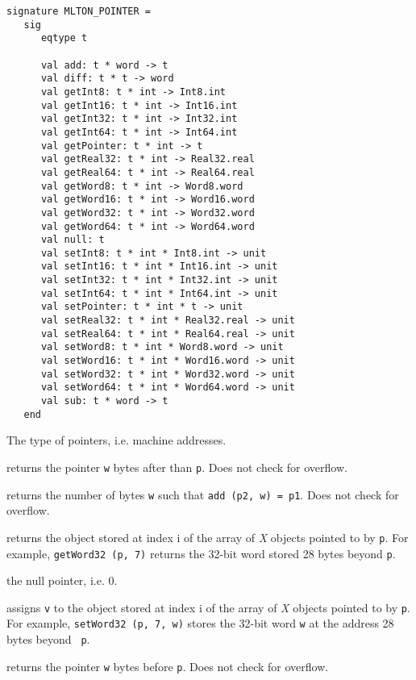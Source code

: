 \begin{verbatim}
signature MLTON_POINTER =
   sig
      eqtype t

      val add: t * word -> t
      val diff: t * t -> word
      val getInt8: t * int -> Int8.int
      val getInt16: t * int -> Int16.int
      val getInt32: t * int -> Int32.int
      val getInt64: t * int -> Int64.int
      val getPointer: t * int -> t
      val getReal32: t * int -> Real32.real
      val getReal64: t * int -> Real64.real
      val getWord8: t * int -> Word8.word
      val getWord16: t * int -> Word16.word
      val getWord32: t * int -> Word32.word
      val getWord64: t * int -> Word64.word
      val null: t
      val setInt8: t * int * Int8.int -> unit
      val setInt16: t * int * Int16.int -> unit
      val setInt32: t * int * Int32.int -> unit
      val setInt64: t * int * Int64.int -> unit
      val setPointer: t * int * t -> unit
      val setReal32: t * int * Real32.real -> unit
      val setReal64: t * int * Real64.real -> unit
      val setWord8: t * int * Word8.word -> unit
      val setWord16: t * int * Word16.word -> unit
      val setWord32: t * int * Word32.word -> unit
      val setWord64: t * int * Word64.word -> unit
      val sub: t * word -> t
   end
\end{verbatim}

\begin{description}
The type of pointers, i.e. machine addresses.

returns the pointer {\tt w} bytes after than {\tt p}.  Does not check
for overflow.

returns the number of bytes {\tt w} such that {\tt add (p2, w) = p1}.
Does not check for overflow.

returns the object stored at index i of the array of {\it X} objects
pointed to by {\tt p}.  For example, {\tt getWord32 (p, 7)} returns
the 32-bit word stored 28 bytes beyond {\tt p}.

the null pointer, i.e. 0.

assigns {\tt v} to the object stored at index i of the array of {\it
X} objects pointed to by {\tt p}.  For example, {\tt setWord32 (p, 7,
w)} stores the 32-bit word {\tt w} at the address 28 bytes beyond {\tt
p}.

returns the pointer {\tt w} bytes before {\tt p}.  Does not check for
overflow.

\end{description}
%
